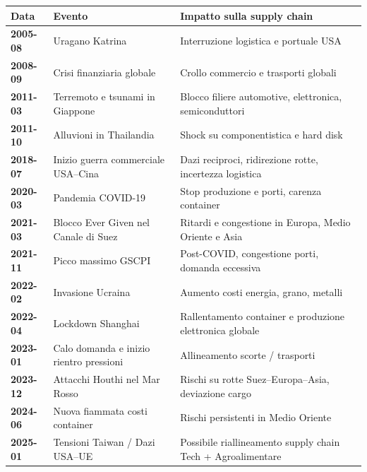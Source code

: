 \documentclass[
  11pt,
  letterpaper,
  DIV=11,
  numbers=noendperiod]{scrartcl}
\begin{document}
\begin{longtable}[]{@{}
  >{\raggedright\arraybackslash}p{}
  >{\raggedright\arraybackslash}p{}
  >{\raggedright\arraybackslash}p{}@{}}
\toprule\noalign{}
\begin{minipage}[b]{\linewidth}\raggedright
Data
\end{minipage} & \begin{minipage}[b]{\linewidth}\raggedright
Evento
\end{minipage} & \begin{minipage}[b]{\linewidth}\raggedright
Impatto sulla supply chain
\end{minipage} \\
\midrule\noalign{}
\endhead
\bottomrule\noalign{}
\endlastfoot
\textbf{2005-08} & Uragano Katrina & Interruzione logistica e portuale
USA \\
\textbf{2008-09} & Crisi finanziaria globale & Crollo commercio e
trasporti globali \\
\textbf{2011-03} & Terremoto e tsunami in Giappone & Blocco filiere
automotive, elettronica, semiconduttori \\
\textbf{2011-10} & Alluvioni in Thailandia & Shock su componentistica e
hard disk \\
\textbf{2018-07} & Inizio guerra commerciale USA--Cina & Dazi reciproci,
ridirezione rotte, incertezza logistica \\
\textbf{2020-03} & Pandemia COVID-19 & Stop produzione e porti, carenza
container \\
\textbf{2021-03} & Blocco Ever Given nel Canale di Suez & Ritardi e
congestione in Europa, Medio Oriente e Asia \\
\textbf{2021-11} & Picco massimo GSCPI & Post-COVID, congestione porti,
domanda eccessiva \\
\textbf{2022-02} & Invasione Ucraina & Aumento costi energia, grano,
metalli \\
\textbf{2022-04} & Lockdown Shanghai & Rallentamento container e
produzione elettronica globale \\
\textbf{2023-01} & Calo domanda e inizio rientro pressioni &
Allineamento scorte / trasporti \\
\textbf{2023-12} & Attacchi Houthi nel Mar Rosso & Rischi su rotte
Suez--Europa--Asia, deviazione cargo \\
\textbf{2024-06} & Nuova fiammata costi container & Rischi persistenti
in Medio Oriente \\
\textbf{2025-01} & Tensioni Taiwan / Dazi USA--UE & Possibile
riallineamento supply chain Tech + Agroalimentare \\
\end{longtable}
\end{document}
